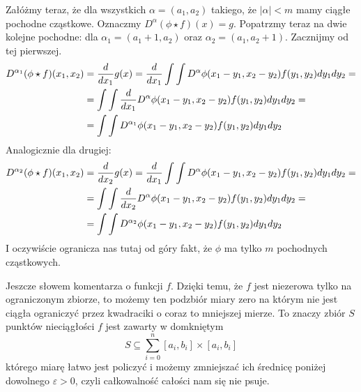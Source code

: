 \documentclass{article}
\begin{document}
Załóżmy teraz, że dla wszystkich $\alpha=(a_1,a_2)$ takiego, że $|\alpha|<m$ mamy ciągłe pochodne cząstkowe. Oznaczmy $D^\alpha(\phi\star f)(x)=g$. Popatrzmy teraz na dwie kolejne pochodne: dla $\alpha_1=(a_1+1,a_2)$ oraz $\alpha_2=(a_1,a_2+1)$. Zacznijmy od tej pierwszej.
\begin{align*}
    D^{\alpha_1}(\phi\star f)(x_1,x_2)&={d\over dx_1}g(x)={d\over dx_1}\int\int D^\alpha \phi(x_1-y_1,x_2-y_2)f(y_1,y_2)dy_1dy_2=\\
    &=\int\int{d\over dx_1}D^\alpha\phi(x_1-y_1,x_2-y_2)f(y_1,y_2)dy_1dy_2=\\
    &=\int\int D^{\alpha_1}\phi(x_1-y_1,x_2-y_2)f(y_1,y_2)dy_1dy_2
\end{align*}
Analogicznie dla drugiej:
\begin{align*}
    D^{\alpha_2}(\phi\star f)(x_1,x_2)&={d\over dx_2}g(x)={d\over dx_1}\int\int D^\alpha \phi(x_1-y_1,x_2-y_2)f(y_1,y_2)dy_1dy_2=\\
    &=\int\int{d\over dx_2}D^\alpha\phi(x_1-y_1,x_2-y_2)f(y_1,y_2)dy_1dy_2=\\
    &=\int\int D^{\alpha_2}\phi(x_1-y_1,x_2-y_2)f(y_1,y_2)dy_1dy_2
\end{align*}
I oczywiście ogranicza nas tutaj od góry fakt, że $\phi$ ma tylko $m$ pochodnych cząstkowych.
\medskip

Jeszcze słowem komentarza o funkcji $f$. Dzięki temu, że $f$ jest niezerowa tylko na ograniczonym zbiorze, to możemy ten podzbiór miary zero na którym nie jest ciągła ograniczyć przez kwadraciki o coraz to mniejszej mierze. To znaczy zbiór $S$ punktów nieciągłości $f$ jest zawarty w domkniętym
$$S\subseteq\sum\limits_{i=0}^n[a_i,b_i]\times[a_i,b_i]$$
którego miarę łatwo jest policzyć i możemy zmniejszać ich średnicę poniżej dowolnego $\varepsilon>0$, czyli całkowalność całości nam się nie psuje.
\end{document}
